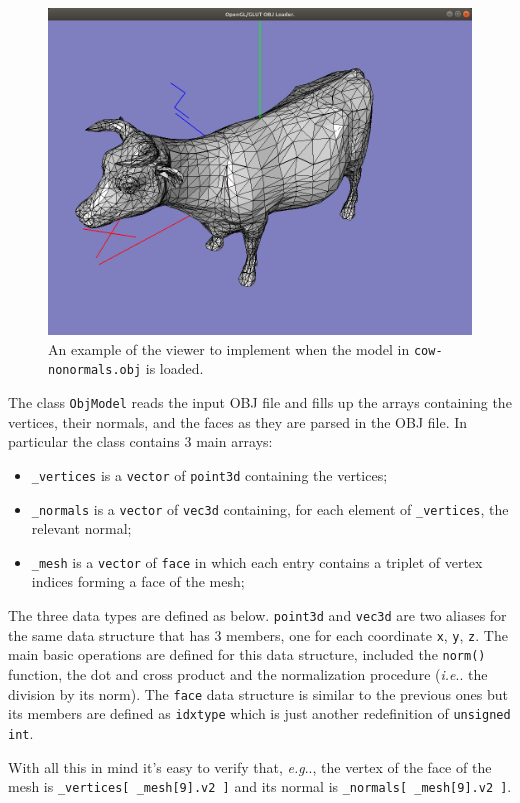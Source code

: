 \documentclass[a4paper,11pt]{article}
\makeatletter
\DeclareRobustCommand\onedot{\futurelet\@let@token\@onedot}
\def\@onedot{\ifx\@let@token.\else.\null\fi\xspace}
\def\eg{\emph{e.g}\onedot} \def\Eg{\emph{E.g}\onedot}
\def\ie{\emph{i.e}\onedot} \def\Ie{\emph{I.e}\onedot}
\newcommand{\hilight}[1]{\colorbox{bg}{#1}}
\newcommand{\coden}[1]{\texttt{#1}}
\newcommand{\code}[1]{\hilight{\texttt{#1}}}
\newcommand{\brand}[1]{\textsf{#1}\xspace}
\newcommand{\obj}{\brand{OBJ}}
\makeatother
\begin{document}
\begin{figure}
\centering
\includegraphics[width=.6\columnwidth]{screenshot}
\caption{An example of the viewer to implement when the model in \coden{cow-nonormals.obj} is loaded.}
\label{fig:viewport}
\end{figure}

The class \coden{ObjModel} reads the input \obj file and fills up the arrays containing the vertices, their normals, and the faces as they are parsed in the \brand{OBJ} file. In particular the class contains 3 main arrays: 
\begin{itemize}
	\item \code{\_vertices} is a \coden{vector} of \coden{point3d} containing the vertices;
	\item \code{\_normals} is a \coden{vector} of \coden{vec3d} containing, for each element of \code{\_vertices}, the relevant normal;
	\item \code{\_mesh} is a \coden{vector} of \coden{face} in which each entry contains a triplet of vertex indices forming a face of the mesh; 
\end{itemize}

The three data types are defined as below. \code{point3d} and \code{vec3d} are two aliases for the same data structure that has 3 members, one for each coordinate \coden{x}, \coden{y}, \coden{z}. The main basic operations are defined for this data structure, included the \coden{norm()} function, the dot and cross product and the normalization procedure (\ie the division by its norm). The \code{face} data structure is similar to the previous ones but its members are defined as \coden{idxtype} which is just another redefinition of \coden{unsigned int}. 

With all this in mind it's easy to verify that, \eg, the  vertex of the  face of the mesh is \code{\_vertices[ \_mesh[9].v2 ]} and its normal is \code{\_normals[ \_mesh[9].v2 ]}.
\end{document}

